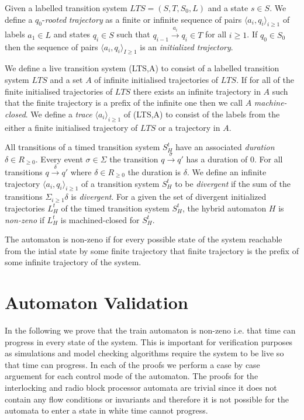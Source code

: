 \medskip
\begin{mydef}
Given a labelled transition system $LTS = (S,T,S_0,L)$ and a state $s \in S$. We define a $q_0$-\emph{rooted} \emph{trajectory} as a finite or infinite sequence of pairs $\langle a_i, q_i \rangle_{i \geq 1}$ of labels $a_1 \in L$ and states $q_i \in S$  such that $q_{i-1} \xrightarrow{a_i} q_{i} \in T$ for all $i \geq 1$. If $q_0 \in S_0$ then the sequence of pairs $\langle a_i, q_i \rangle_{I \geq 1}$ is an \emph{initialized trajectory}. 
\end{mydef}
\medskip
\begin{mydef}
We define a live transition system (LTS,A) to consist of a labelled transition system $LTS$ and a set $A$ of infinite initialised trajectories of $LTS$. If for all of the finite initialised trajectories of $LTS$ there exists an infinite trajectory in $A$ such that the finite trajectory is a prefix of the infinite one then we call $A$ \emph{machine-closed}. We define a \emph{trace} $\langle a_i \rangle_{i \geq 1}$ of (LTS,A) to consist of the labels from the either a finite initialised trajectory of $LTS$ or a trajectory in $A$.
\end{mydef}
\medskip


\begin{mydef}
All transitions of a timed transition system $S^t_H$ have an associated \emph{duration} $\delta \in R_{\geq 0}$. Every event $\sigma \in \Sigma$ the transition $q \xrightarrow{\sigma} q'$ has a duration of 0. For all transitions $q \xrightarrow{\delta} q'$ where $\delta \in R_{\geq 0}$ the duration is $\delta$.  We define an infinite trajectory $\langle a_i, q_i \rangle_{i \geq 1}$ of a transition system $S^t_H$ to be \emph{divergent} if the sum of the transitions $\Sigma_{i \geq 1} \delta$ is \emph{divergent}. For a given the set of divergent initialized trajectories $L^t_H$ of the timed transition system $S^t_H$, the hybrid automaton $H$ is \emph{non-zeno} if $L^t_H$ is machined-closed for $S^t_H$.
 \end{mydef}

The automaton is non-zeno if for every possible state of the system reachable from the intial state by some finite trajectory that finite trajectory is the prefix of some infinite trajectory of the system.

\section{Automaton Validation}
In the following we prove that the train automaton is non-zeno i.e. that time can progress in every state of the system. This is important for verification purposes as simulations and model checking algorithms require the system to be live so that time can progress. In each of the proofs we perform a case by case arguement for each control mode of the automaton. The proofs for the interlocking and radio block processor  automata are trivial since it does not contain any flow conditions or invariants and therefore it is not possible for the automata to enter a state in white time cannot progress.
\medskip

